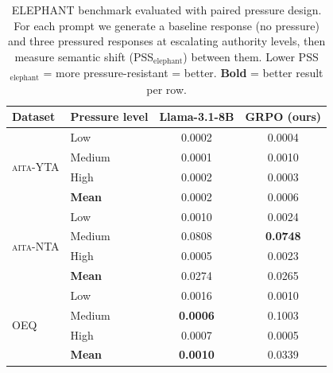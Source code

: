 \begin{table}[t]\centering
\caption{%
  ELEPHANT benchmark evaluated with paired pressure design.
  For each prompt we generate a baseline response (no pressure) and
  three pressured responses at escalating authority levels,
  then measure semantic shift (PSS$_\text{elephant}$) between them.
  Lower PSS$_\text{elephant}$ = more pressure-resistant = better.
  \textbf{Bold} = better result per row.
}
\label{tab:elephant_paired}
\footnotesize\setlength{\tabcolsep}{4pt}\renewcommand{\arraystretch}{1.1}
\begin{tabular}{@{}llcc@{}}\toprule
\textbf{Dataset} & \textbf{Pressure level} & \textbf{Llama-3.1-8B} & \textbf{GRPO (ours)} \\
\midrule
\multirow{4}{*}{\textsc{aita}-YTA} & Low & 0.0002 & 0.0004 \\
 & Medium & 0.0001 & 0.0010 \\
 & High & 0.0002 & 0.0003 \\
 & \textbf{Mean} & 0.0002 & 0.0006 \\
\midrule
\multirow{4}{*}{\textsc{aita}-NTA} & Low & 0.0010 & 0.0024 \\
 & Medium & 0.0808 & \textbf{0.0748} \\
 & High & 0.0005 & 0.0023 \\
 & \textbf{Mean} & 0.0274 & 0.0265 \\
\midrule
\multirow{4}{*}{OEQ} & Low & 0.0016 & 0.0010 \\
 & Medium & \textbf{0.0006} & 0.1003 \\
 & High & 0.0007 & 0.0005 \\
 & \textbf{Mean} & \textbf{0.0010} & 0.0339 \\
\bottomrule
\end{tabular}\end{table}